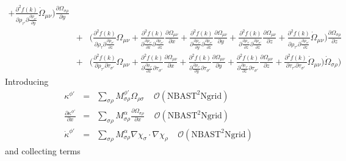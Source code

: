\documentclass[preprint,preprintnumbers,amsmath,amssymb,11pt]{revtex4}
\begin{document}
\begin{eqnarray}
+ \frac{\partial^{2} f(k)}{\partial \rho_{\tau'} \partial \frac{\partial \rho_{\sigma'}}{\partial y}} \dot{\Omega}_{\mu \nu}
\biggr) \frac{\partial \Omega_{\sigma \rho}}{\partial y} \nonumber\\
&+&\biggl( \frac{\partial^{2} f(k)}{\partial \rho_{\tau} \partial \frac{\partial \rho_{\sigma'}}{\partial z}} \Omega_{\mu \nu} 
+ \frac{\partial^{2} f(k)}{\partial \frac{\partial \rho_{\tau'}}{\partial x} \partial \frac{\partial \rho_{\sigma'}}{\partial z}} \frac{\partial \Omega_{\mu \nu}}{\partial x}
+ \frac{\partial^{2} f(k)}{\partial \frac{\partial \rho_{\tau'}}{\partial y} \partial \frac{\partial \rho_{\sigma'}}{\partial z}} \frac{\partial \Omega_{\mu \nu}}{\partial y}
+ \frac{\partial^{2} f(k)}{\partial \frac{\partial \rho_{\tau'}}{\partial z} \partial \frac{\partial \rho_{\sigma'}}{\partial z}} \frac{\partial \Omega_{\mu \nu}}{\partial z}
+ \frac{\partial^{2} f(k)}{\partial \rho_{\tau'} \partial \frac{\partial \rho_{\sigma'}}{\partial z}} \dot{\Omega}_{\mu \nu}
\biggr) \frac{\partial \Omega_{\sigma \rho}}{\partial z}  \nonumber\\
&+&\biggl( \frac{\partial^{2} f(k)}{\partial \rho_{\tau'} \partial \tau_{\sigma'}} \Omega_{\mu \nu}
+ \frac{\partial^{2} f(k)}{\partial \frac{\partial \rho_{\tau'}}{\partial x} \partial \tau_{\sigma'}} \frac{\partial \Omega_{\mu \nu}}{\partial x}
+ \frac{\partial^{2} f(k)}{\partial \frac{\partial \rho_{\tau'}}{\partial y} \partial \tau_{\sigma'}} \frac{\partial \Omega_{\mu \nu}}{\partial y}
+ \frac{\partial^{2} f(k)}{\partial \frac{\partial \rho_{\tau'}}{\partial z} \partial \tau_{\sigma'}} \frac{\partial \Omega_{\mu \nu}}{\partial z}
+ \frac{\partial^{2} f(k)}{\partial \tau_{\tau'} \partial \tau_{\sigma'}} \dot{\Omega}_{\mu \nu}
\biggr)  \dot{\Omega}_{\sigma \rho}
\biggr)\nonumber
\end{eqnarray}
Introducing 
\begin{eqnarray}
\kappa^{\phi'} &=& \sum_{\sigma \rho} M^{\phi'}_{\sigma \rho} \Omega_{\rho \sigma}   \ \ \ \ \ \mathcal{O}(\mathrm{NBAST}^{2}\mathrm{Ngrid})\\
\frac{\partial \kappa^{\phi'}}{\partial x} &=& \sum_{\sigma \rho} M^{\alpha}_{\sigma \rho} \frac{\partial \Omega_{\sigma \rho}}{\partial x}  \ \ \ \ \ \mathcal{O}(\mathrm{NBAST}^{2}\mathrm{Ngrid})\\
\dot{\kappa}^{\phi'} &=& \sum_{\sigma \rho} M^{\alpha}_{\sigma \rho} \nabla \chi_{\sigma} \cdot \nabla \chi_{\rho}   \ \ \ \ \ \mathcal{O}(\mathrm{NBAST}^{2}\mathrm{Ngrid})
\end{eqnarray}
and collecting terms
\end{document}
